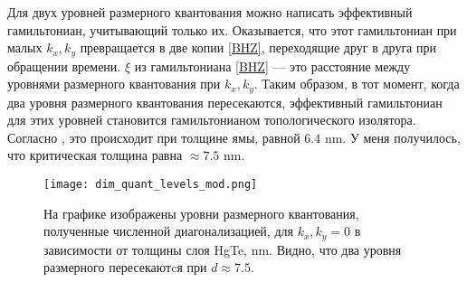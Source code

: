 Для двух уровней размерного квантования можно написать эффективный гамильтониан,
учитывающий только их. Оказывается, что этот гамильтониан при малых $k_x,k_y$ превращается
в две копии 
\eqref{BHZ}, переходящие друг в друга при обращении времени. $\xi$ из гамильтониана \eqref{BHZ} --- это расстояние между уровнями размерного
квантования при $k_x, k_y$. Таким образом, в тот момент, когда два уровня размерного 
квантования пересекаются, эффективный гамильтониан для этих уровней становится 
гамильтонианом топологического изолятора. Согласно \cite{Bernevig2006}, это происходит
при толщине ямы, равной $6.4$ nm. У меня получилось, что критическая толщина равна
$\approx 7.5$ nm.

\begin{figure}[h]
    \texttt{[image: dim\_quant\_levels\_mod.png]}
    \caption{
            На графике изображены уровни размерного квантования, полученные 
            численной диагонализацией, для $k_x, k_y = 0$
            в зависимости от толщины слоя HgTe, nm. Видно, что два уровня размерного
            пересекаютcя при $d \approx 7.5$.
            }
\end{figure}
